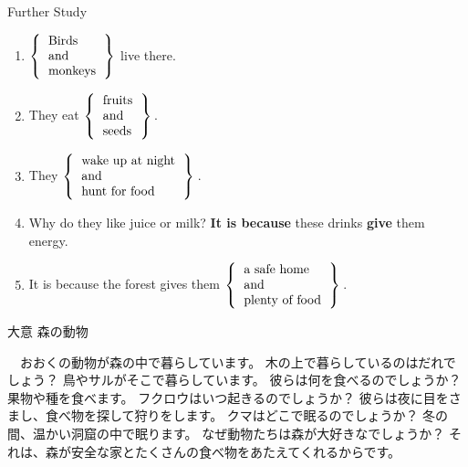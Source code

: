 \documentclass[aspectratio=169,xcolor={dvipsnames,table}]{beamer}
\begin{document}
\begin{frame}[plain]{Further Study}
 
\begin{enumerate}
 \item $\left\{ 
\begin{tabular}{l}
 Birds\\
 and\\
 monkeys\\
\end{tabular}
\right\}$
live there.
 \item They eat $\left\{ 
\begin{tabular}{l}
 fruits\\
 and\\
 seeds\\
\end{tabular}
\right\}$\,.
 \item They $\left\{ 
\begin{tabular}{l}
 wake up at night\\
 and\\
 hunt for food\\
\end{tabular}
\right\}$\,.
 \item Why do they like juice or milk? \textbf{It is because} these drinks \textbf{give} them energy.
 \item It  is because the forest gives them $\left\{ 
\begin{tabular}{l}
 a safe home\\
 and\\
 plenty of food\\
\end{tabular}
\right\}$\,.

\end{enumerate}
\end{frame}
\begin{frame}[plain]{大意}
森の動物

\bigskip

　おおくの動物が森の中で暮らしています。
木の上で暮らしているのはだれでしょう？
鳥やサルがそこで暮らしています。
彼らは何を食べるのでしょうか？ 果物や種を食べます。
フクロウはいつ起きるのでしょうか？ 彼らは夜に目をさまし、食べ物を探して狩りをします。
クマはどこで眠るのでしょうか？ 冬の間、温かい洞窟の中で眠ります。
なぜ動物たちは森が大好きなでしょうか？
それは、森が安全な家とたくさんの食べ物をあたえてくれるからです。　
\end{frame}
\end{document}
